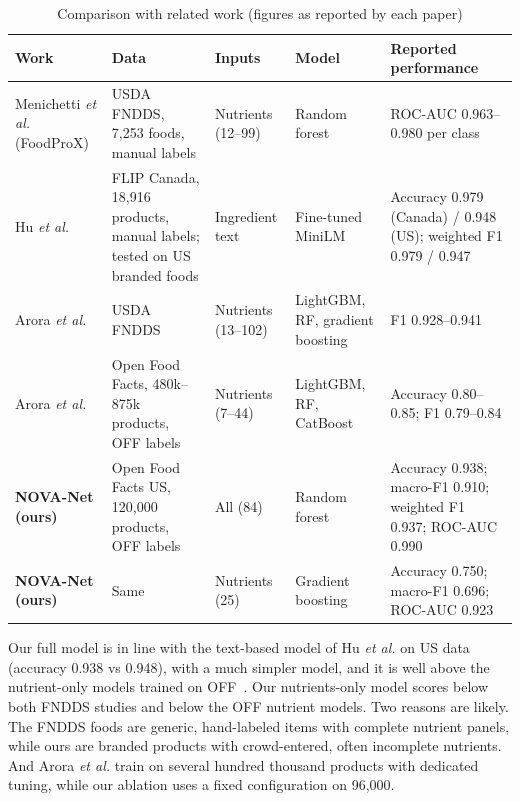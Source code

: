 \documentclass[conference]{IEEEtran}
\begin{document}
\begin{table}[t]
\centering
\caption{Comparison with related work (figures as reported by each paper)}
\label{tab:related}
\setlength{\tabcolsep}{4pt}
\begin{tabular}{>{\raggedright\arraybackslash}p{3.3cm}>{\raggedright\arraybackslash}p{3.9cm}>{\raggedright\arraybackslash}p{2.2cm}>{\raggedright\arraybackslash}p{2.4cm}>{\raggedright\arraybackslash}p{4.4cm}}
\toprule
Work & Data & Inputs & Model & Reported performance \\
\midrule
Menichetti \emph{et al.}~\cite{menichetti2023foodprox} (FoodProX) & USDA FNDDS, 7,253 foods, manual labels & Nutrients (12--99) & Random forest & ROC-AUC 0.963--0.980 per class \\
Hu \emph{et al.}~\cite{hu2023nutrients} & FLIP Canada, 18,916 products, manual labels; tested on US branded foods & Ingredient text & Fine-tuned MiniLM & Accuracy 0.979 (Canada) / 0.948 (US); weighted F1 0.979 / 0.947 \\
Arora \emph{et al.}~\cite{arora2025fndds} & USDA FNDDS & Nutrients (13--102) & LightGBM, RF, gradient boosting & F1 0.928--0.941 \\
Arora \emph{et al.}~\cite{arora2025off} & Open Food Facts, 480k--875k products, OFF labels & Nutrients (7--44) & LightGBM, RF, CatBoost & Accuracy 0.80--0.85; F1 0.79--0.84 \\
\midrule
\textbf{NOVA-Net (ours)} & Open Food Facts US, 120,000 products, OFF labels & All (84) & Random forest & Accuracy 0.938; macro-F1 0.910; weighted F1 0.937; ROC-AUC 0.990 \\
\textbf{NOVA-Net (ours)} & Same & Nutrients (25) & Gradient boosting & Accuracy 0.750; macro-F1 0.696; ROC-AUC 0.923 \\
\bottomrule
\end{tabular}
\end{table}

Our full model is in line with the text-based model of Hu \emph{et al.} on US data (accuracy 0.938 vs 0.948), with a much simpler model, and it is well above the nutrient-only models trained on OFF~\cite{arora2025off}. Our nutrients-only model scores below both FNDDS studies and below the OFF nutrient models. Two reasons are likely. The FNDDS foods are generic, hand-labeled items with complete nutrient panels, while ours are branded products with crowd-entered, often incomplete nutrients. And Arora \emph{et al.} train on several hundred thousand products with dedicated tuning, while our ablation uses a fixed configuration on 96,000.
\end{document}
